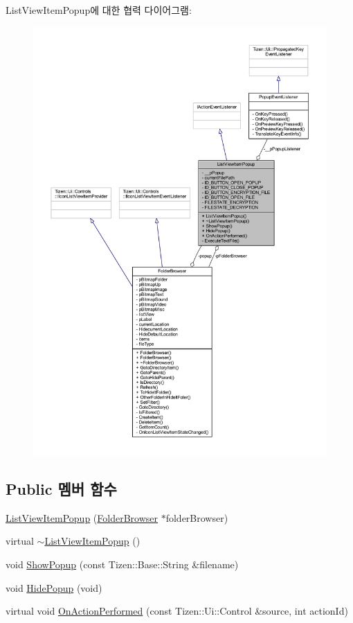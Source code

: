 List\+View\+Item\+Popup에 대한 협력 다이어그램\+:
\nopagebreak
\begin{figure}[H]
\begin{center}
\leavevmode
\includegraphics[width=350pt]{class_list_view_item_popup__coll__graph}
\end{center}
\end{figure}
\subsection*{Public 멤버 함수}
\begin{DoxyCompactItemize}
\item 
\hyperlink{class_list_view_item_popup_af87aac8b00f13e18b37cece6362879d4}{List\+View\+Item\+Popup} (\hyperlink{class_folder_browser}{Folder\+Browser} $\ast$folder\+Browser)
\item 
virtual \hyperlink{class_list_view_item_popup_a54ae38edf9c99233d8fc958efb1666b1}{$\sim$\+List\+View\+Item\+Popup} ()
\item 
void \hyperlink{class_list_view_item_popup_a6e5821dcd07b75edad9775650c8d5a63}{Show\+Popup} (const Tizen\+::\+Base\+::\+String \&filename)
\item 
void \hyperlink{class_list_view_item_popup_a5ae90134642d7aea3ae0b5389ea144a8}{Hide\+Popup} (void)
\item 
virtual void \hyperlink{class_list_view_item_popup_ac46352b7db50a19ad67c15f0b1c238bc}{On\+Action\+Performed} (const Tizen\+::\+Ui\+::\+Control \&source, int action\+Id)
\end{DoxyCompactItemize}

